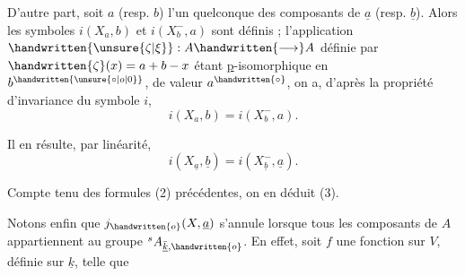 D'autre part, soit $a$ (resp. $b$) l'un quelconque des composants de $\underline{a}$ (resp. $\underline{b}$). Alors les symboles $i(X_a,b)$ et $i(X^{-}_b,a)$ sont définis ; l'application $\handwritten{\unsure{\zeta|\xi}}:A\handwritten{\longrightarrow}A$ définie par $\handwritten{\zeta}(x)=a+b-x$ étant \uline{p}-isomorphique en $b^{\handwritten{\unsure{\circ|o|0}}}$, de valeur $a^{\handwritten{\circ}}$, on a, d'après la propriété d'invariance du symbole $i$,
\[
i(X_a,b)=i(X^{-}_b,a).
\]

Il en résulte, par linéarité,
\[
i(X_{\underline{a}},\underline{b})=i(X^{-}_{\underline{b}},\underline{a}).
\]

Compte tenu des formules (2) précédentes, on en déduit (3).

Notons enfin que $j_{\handwritten{o}}(X,\underline{a})$ s'annule lorsque tous les composants de $A$ appartiennent au groupe ${}^{s}A_{\bar{\underline{k}},\handwritten{o}}$. En effet, soit $f$ une fonction sur $V$, définie sur $\underline{k}$, telle que

